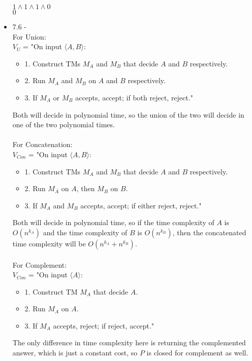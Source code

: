 \documentclass{article}
\begin{document}
\begin{itemize}
    $1 \land 1 \land 1 \land 0$ \\
    $0$ \\
  \item 7.6 - \\
    For Union:\\
    $V_{U}$ = "On input $\langle A, B \rangle$:
    \begin{itemize}
      \item 1. Construct TMs $M_{A}$ and $M_{B}$ that decide $A$ and $B$ respectively.
      \item 2. Run $M_{A}$ and $M_{B}$ on $A$ and $B$ respectively.
      \item 3. If $M_{A}$ or $M_{B}$ accepts, accept; if both reject, reject."
    \end{itemize}
    Both will decide in polynomial time, so the union of the two will decide in one of the two polynomial times. \\
    \\
    For Concatenation:\\
    $V_{Con}$ = "On input $\langle A, B \rangle$:
    \begin{itemize}
      \item 1. Construct TMs $M_{A}$ and $M_{B}$ that decide $A$ and $B$ respectively.
      \item 2. Run $M_{A}$ on $A$, then $M_{B}$ on $B$.
      \item 3. If $M_{A}$ and $M_{B}$ accepts, accept; if either reject, reject."
    \end{itemize}
    Both will decide in polynomial time, so if the time complexity of $A$ is $O(n^{k_{A}})$ and the time complexity of $B$ is $O(n^{k_{B}})$, then the concatenated time complexity will be $O(n^{k_{A}} + n^{k_{B}})$. \\
    \\
    For Complement:\\
    $V_{Con}$ = "On input $\langle A \rangle$:
    \begin{itemize}
      \item 1. Construct TM $M_{A}$ that decide $A$.
      \item 2. Run $M_{A}$ on $A$.
      \item 3. If $M_{A}$ accepts, reject; if reject, accept."
    \end{itemize}
    The only difference in time complexity here is returning the complemented answer, which is just a constant cost, so $P$ is closed for complement as well.


\end{itemize}
\end{document}
